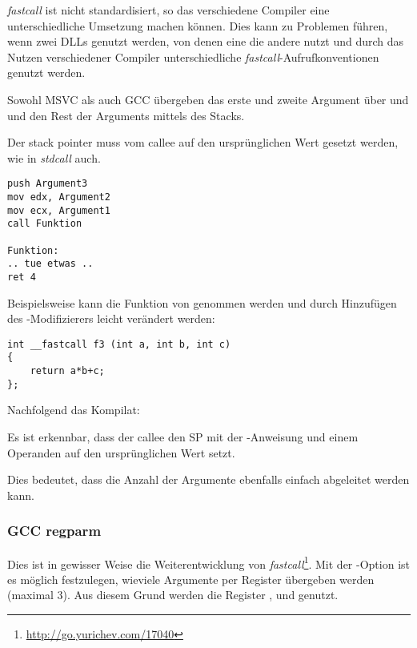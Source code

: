\emph{fastcall} ist nicht standardisiert, so das verschiedene Compiler eine unterschiedliche
Umsetzung machen können.
Dies kann zu Problemen führen, wenn zwei DLLs genutzt werden, von denen eine die andere nutzt
und durch das Nutzen verschiedener Compiler unterschiedliche \emph{fastcall}-Aufrufkonventionen
genutzt werden.

Sowohl MSVC als auch GCC übergeben das erste und zweite Argument über \ECX und \EDX und den Rest
der Arguments mittels des Stacks.

Der \gls{stack pointer} muss vom \gls{callee} auf den ursprünglichen Wert gesetzt werden,
wie in \emph{stdcall} auch.

\begin{lstlisting}[caption=fastcall]
push Argument3
mov edx, Argument2
mov ecx, Argument1
call Funktion

Funktion:
.. tue etwas ..
ret 4
\end{lstlisting}

Beispielsweise kann die Funktion von  genommen werden und durch
Hinzufügen des -Modifizierers leicht verändert werden:

\begin{lstlisting}
int __fastcall f3 (int a, int b, int c)
{
	return a*b+c;
};
\end{lstlisting}

Nachfolgend das Kompilat:

%


Es ist erkennbar, dass der \gls{callee} den \ac{SP} mit der -Anweisung
und einem Operanden auf den ursprünglichen Wert setzt.

Dies bedeutet, dass die Anzahl der Argumente ebenfalls einfach abgeleitet werden kann.

\subsubsection{GCC regparm}

\newcommand{\URLREGPARMM}{\url{http://go.yurichev.com/17040}}

Dies ist in gewisser Weise die Weiterentwicklung von \emph{fastcall}\footnote{\URLREGPARMM}.
Mit der -Option ist es möglich festzulegen, wieviele Argumente per Register
übergeben werden (maximal 3).
Aus diesem Grund werden die Register \EAX, \EDX und \ECX genutzt.

